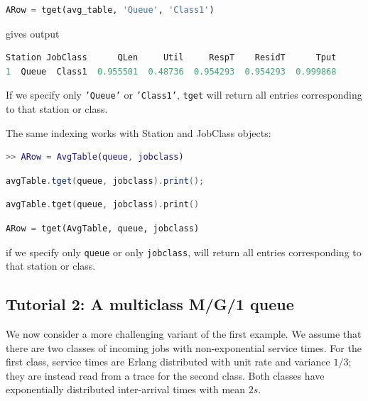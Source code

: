 \begin{PYTHON}
\begin{lstlisting}[language = python]
ARow = tget(avg_table, 'Queue', 'Class1')
\end{lstlisting}
gives output
\begin{lstlisting}[language = python]
   Station JobClass      QLen     Util     RespT    ResidT      Tput
1  Queue  Class1  0.955501  0.48736  0.954293  0.954293  0.999868
\end{lstlisting}
If we specify only \texttt{'Queue'} or \texttt{'Class1'}, \texttt{tget} will return all entries corresponding to that station or class.
\end{PYTHON}
The same indexing works with Station and JobClass objects:
\begin{MATLAB}
\begin{lstlisting}[language = matlab]
>> ARow = AvgTable(queue, jobclass)
\end{lstlisting}
\end{MATLAB}
\begin{JAVA}
\begin{lstlisting}[language = java, basicstyle=\ttfamily\scriptsize]
avgTable.tget(queue, jobclass).print();
\end{lstlisting}
\end{JAVA}
\begin{KOTLIN}
\begin{lstlisting}[language = kotlin, basicstyle=\ttfamily\scriptsize]
avgTable.tget(queue, jobclass).print()
\end{lstlisting}
\end{KOTLIN}
\begin{PYTHON}
\begin{lstlisting}[language = python]
ARow = tget(AvgTable, queue, jobclass)
\end{lstlisting}
\end{PYTHON}
if we specify only \texttt{queue} or only \texttt{jobclass},  will return all entries corresponding to that station or class.


\subsection{Tutorial 2: A multiclass M/G/1 queue}
\label{example-2-multiclass-mgk-queue}
We now consider a more challenging variant of the first example. We assume that there are two classes of incoming jobs with non-exponential service times. For the first class, service times are Erlang distributed with unit rate and variance $1/3$; they are instead read from a trace for the second class. Both classes have exponentially distributed inter-arrival times with mean $2s$.

